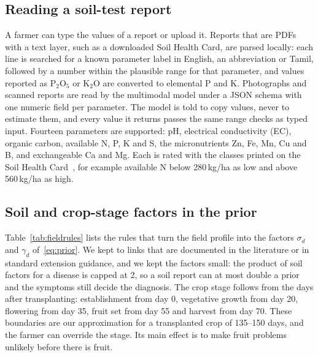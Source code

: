 \documentclass[conference]{IEEEtran}
\begin{document}
\subsection{Reading a soil-test report}
A farmer can type the values of a report or upload it. Reports that are PDFs with a text layer, such as a downloaded Soil Health Card, are parsed locally: each line is searched for a known parameter label in English, an abbreviation or Tamil, followed by a number within the plausible range for that parameter, and values reported as P$_2$O$_5$ or K$_2$O are converted to elemental P and K. Photographs and scanned reports are read by the multimodal model under a JSON schema with one numeric field per parameter. The model is told to copy values, never to estimate them, and every value it returns passes the same range checks as typed input. Fourteen parameters are supported: pH, electrical conductivity (EC), organic carbon, available N, P, K and S, the micronutrients Zn, Fe, Mn, Cu and B, and exchangeable Ca and Mg. Each is rated with the classes printed on the Soil Health Card~\cite{shc,muhr1965,lindsay1978}, for example available N below 280\,kg/ha as low and above 560\,kg/ha as high.

\subsection{Soil and crop-stage factors in the prior}
Table~\ref{tab:fieldrules} lists the rules that turn the field profile into the factors $\sigma_d$ and $\gamma_d$ of~\eqref{eq:prior}. We kept to links that are documented in the literature or in standard extension guidance, and we kept the factors small: the product of soil factors for a disease is capped at 2, so a soil report can at most double a prior and the symptoms still decide the diagnosis. The crop stage follows from the days after transplanting: establishment from day 0, vegetative growth from day 20, flowering from day 35, fruit set from day 55 and harvest from day 70. These boundaries are our approximation for a transplanted crop of 135--150 days, and the farmer can override the stage. Its main effect is to make fruit problems unlikely before there is fruit.
\end{document}
